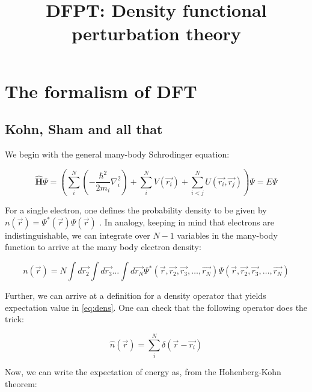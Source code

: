 \message{ !name(dfpt.tex)}\documentclass[]{article}
\title{DFPT: Density functional perturbation theory}
\author{}
\begin{document}


\maketitle



\section{The formalism of DFT}
        \subsection{Kohn, Sham and all that}

        We begin with the general many-body Schrodinger equation:

        \begin{equation} \label{eq:schrod}
          \bm{\widehat{H}}\Psi = \left( \sum_{i}^{N} \left(-\frac{\hbar^2}{2m_i}\nabla_i^2\right)
            + \sum_{i}^{N}V(\vec{r_i}) + \sum_{i<j}^{N}U(\vec{r_i}, \vec{r_j})\right)\Psi = E\Psi
        \end{equation}

        For a single electron, one defines the probability density to be given by
        $n(\vec{r}) = \Psi^*(\vec{r})\Psi(\vec{r})$ . In analogy, keeping in mind
        that electrons are indistinguishable, we can integrate over $N-1$ variables
        in the many-body function to arrive at the many body electron density:

        \begin{equation} \label{eq:dens}
          n(\vec{r}) = N\int d\vec{r_2}\int d\vec{r_3} \ldots \int d\vec{r_N}
          \Psi^*(\vec{r}, \vec{r_2}, \vec{r_3}, \ldots, \vec{r_N})  \Psi(\vec{r},
          \vec{r_2}, \vec{r_3}, \ldots, \vec{r_N})
        \end{equation}

        Further, we can arrive at a definition for a density operator that yields
        expectation value in \ref{eq:dens}. One can check that the following operator
        does the trick:

        \begin{equation} \label{eq:density}
                \widehat{n}(\vec{r}) = \sum_{i}^{N} \delta(\vec{r} - \vec{r_i})
        \end{equation}

        Now, we can write the expectation of energy as, from the Hohenberg-Kohn theorem:
\end{document}
